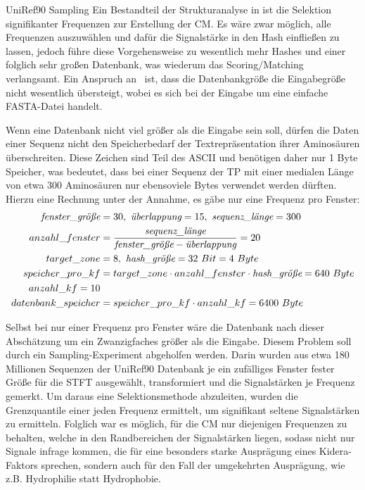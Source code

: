     \begin{experiment}{UniRef90 Sampling} %
        \label{exp:uniref90}
        Ein Bestandteil der Strukturanalyse in  ist die Selektion signifikanter Frequenzen zur Erstellung der \ac{CM}. Es wäre zwar möglich, alle Frequenzen auszuwählen und dafür die Signalstärke in den Hash einfließen zu lassen, jedoch führe diese Vorgehensweise zu wesentlich mehr Hashes und einer folglich sehr großen Datenbank, was wiederum das Scoring/Matching verlangsamt. Ein Anspruch an \protfin\ ist, dass die Datenbankgröße die Eingabegröße nicht wesentlich übersteigt, wobei es sich bei der Eingabe um eine einfache FASTA-Datei handelt.

         Wenn eine Datenbank nicht viel größer als die Eingabe sein soll, dürfen die Daten einer Sequenz nicht den Speicherbedarf der Textrepräsentation ihrer Aminosäuren überschreiten. Diese Zeichen sind Teil des \ac{ASCII} und benötigen daher nur 1 Byte Speicher, was bedeutet, dass bei einer Sequenz der \ac{TP} mit einer medialen Länge von etwa 300 Aminosäuren nur ebensoviele Bytes verwendet werden dürften. Hierzu eine Rechnung unter der Annahme, es gäbe nur eine Frequenz pro Fenster:
        \begin{equation}
            \begin{split}
                \emph{fenster\_größe} &= 30,\ \emph{überlappung} = 15,\ \emph{sequenz\_länge} = 300\\
                anzahl\_fenster &= \frac{\emph{sequenz\_länge}}{\emph{fenster\_größe} - \emph{überlappung}} = 20\\
                target\_zone &= 8,\ \emph{hash\_größe} = 32\ Bit = 4\ Byte\\
                speicher\_pro\_kf &= target\_zone \cdot anzahl\_fenster \cdot \emph{hash\_größe} = 640\ Byte\\
                anzahl\_kf = 10\\
                datenbank\_speicher &= speicher\_pro\_kf \cdot anzahl\_kf = 6400\ Byte
            \end{split}
        \end{equation}

        Selbst bei nur einer Frequenz pro Fenster wäre die Datenbank nach dieser Abschätzung um ein Zwanzigfaches größer als die Eingabe. Diesem Problem soll durch ein Sampling-Experiment abgeholfen werden. Darin wurden aus etwa 180 Millionen Sequenzen der UniRef90 Datenbank je ein zufälliges Fenster fester Größe für die \ac{STFT} ausgewählt, transformiert und die Signalstärken je Frequenz gemerkt. Um daraus eine Selektionsmethode abzuleiten, wurden die Grenzquantile einer jeden Frequenz ermittelt, um signifikant seltene Signalstärken zu ermitteln. Folglich war es möglich, für die \ac{CM} nur diejenigen Frequenzen zu behalten, welche in den Randbereichen der Signalstärken liegen, sodass nicht nur Signale infrage kommen, die für eine besonders starke Ausprägung eines Kidera-Faktors sprechen, sondern auch für den Fall der umgekehrten Ausprägung, wie z.B. Hydrophilie statt Hydrophobie.


\end{experiment}
